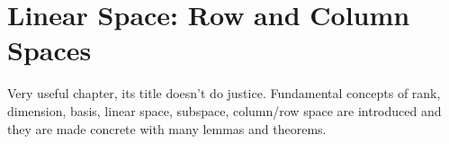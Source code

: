 \documentclass[a4paper, oneside]{book}
\begin{document}
\chapter{Linear Space: Row and Column Spaces}

Very useful chapter, its title doesn't do justice. Fundamental concepts of rank, dimension, basis, linear space, subspace, column/row space are introduced and they are made concrete with many lemmas and theorems.
\end{document}
